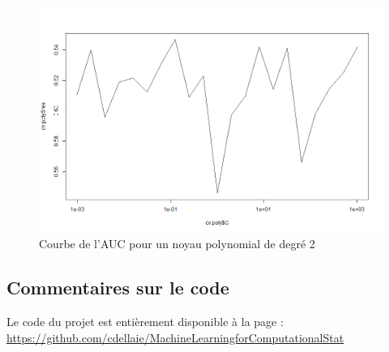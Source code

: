 \documentclass{article}
\begin{document}
\begin{figure}[!h]\centering
\includegraphics[scale=0.4]{auc.png}
\caption{Courbe de l'AUC pour un noyau polynomial de degré 2}
\label{fig:AUC Poly}
\end{figure}

\subsection{Commentaires sur le code}

Le code du projet est entièrement disponible à la page :\\

\url{https://github.com/cdellaie/MachineLearningforComputationalStat}





 
\end{document}
